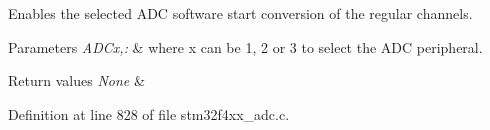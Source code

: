 Enables the selected A\-D\-C software start conversion of the regular channels. 


\begin{DoxyParams}{Parameters}
{\em A\-D\-Cx,\-:} & where x can be 1, 2 or 3 to select the A\-D\-C peripheral. \\
\hline
\end{DoxyParams}

\begin{DoxyRetVals}{Return values}
{\em None} & \\
\hline
\end{DoxyRetVals}


Definition at line 828 of file stm32f4xx\-\_\-adc.\-c.

